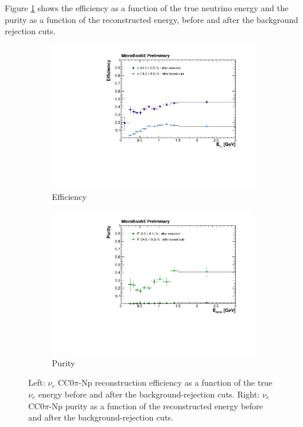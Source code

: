 Figure \ref{fig:effafter} shows the efficiency as a function of the true neutrino energy and the purity as a function of the reconstructed energy, before and after the background rejection cuts. 

\begin{figure}
  \begin{subfigure}{0.48\textwidth}
    \includegraphics[width=\linewidth]{figures/eff_after.pdf}
    \caption{Efficiency} 
  \end{subfigure}
    \begin{subfigure}{0.48\textwidth}
    \includegraphics[width=\linewidth]{figures/purity_after.pdf}
    \caption{Purity} 
  \end{subfigure}
  \caption{Left: $\nu_{e}$ CC$0\pi$-Np reconstruction efficiency as a function of the true $\nu_{e}$ energy before and after the background-rejection cuts. Right: $\nu_{e}$ CC$0\pi$-Np purity as a function of the reconstructed energy before and after the background-rejection cuts.}
  \label{fig:effafter}
\end{figure}

